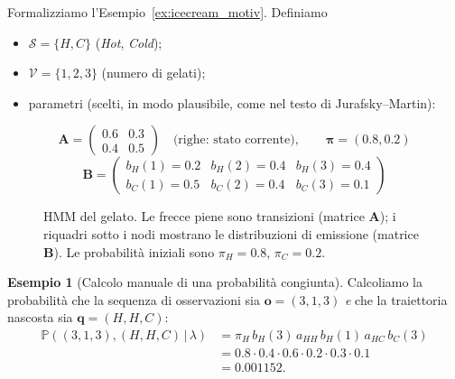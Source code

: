 \documentclass[11pt,a4paper,oneside]{book}
\theoremstyle{plain}
\theoremstyle{definition}
\newtheorem{esempio}[teorema]{Esempio}
\theoremstyle{remark}
\newcommand{\Prob}{\mathbb{P}}
\newcommand{\states}{\mathcal{S}}            %
\newcommand{\obssym}{\mathcal{V}}            %
\newcommand{\Amat}{\mathbf{A}}               %
\newcommand{\Bmat}{\mathbf{B}}               %
\newcommand{\initvec}{\boldsymbol{\pi}}      %
\newcommand{\hmm}{\lambda}                   %
\newcommand{\seqobs}{\mathbf{o}}             %
\newcommand{\seqstates}{\mathbf{q}}          %
\newcommand{\given}{\,\vert\,}
\begin{document}
Formalizziamo l'Esempio~\ref{ex:icecream_motiv}. Definiamo
\begin{itemize}[leftmargin=*]
    \item $\states=\{H,C\}$ (\emph{Hot}, \emph{Cold});
    \item $\obssym=\{1,2,3\}$ (numero di gelati);
    \item parametri (scelti, in modo plausibile, come nel testo di
          Jurafsky--Martin):
\end{itemize}
\[
\Amat = \begin{pmatrix} 0.6 & 0.3 \\ 0.4 & 0.5 \end{pmatrix}
\quad\text{(righe: stato corrente)},\qquad
\initvec = (0.8, 0.2)
\]
\[
\Bmat = \begin{pmatrix}
b_H(1)=0.2 & b_H(2)=0.4 & b_H(3)=0.4\\
b_C(1)=0.5 & b_C(2)=0.4 & b_C(3)=0.1
\end{pmatrix}
\]

\begin{figure}[h!]
\centering
{}
\caption{HMM del gelato. Le frecce piene sono transizioni (matrice
$\Amat$); i riquadri sotto i nodi mostrano le distribuzioni di
emissione (matrice $\Bmat$). Le probabilità iniziali sono $\pi_H=0.8$,
$\pi_C=0.2$.}
\label{fig:icecream_hmm}
\end{figure}

\begin{esempio}[Calcolo manuale di una probabilità congiunta]
\label{ex:joint_manual}
Calcoliamo la probabilità che la sequenza di osservazioni sia
$\seqobs=(3,1,3)$ \emph{e} che la traiettoria nascosta sia
$\seqstates=(H,H,C)$:
\begin{align*}
\Prob((3,1,3),(H,H,C)\given\hmm)
&= \pi_H\,b_H(3)\,a_{HH}\,b_H(1)\,a_{HC}\,b_C(3)\\
&= 0.8 \cdot 0.4 \cdot 0.6 \cdot 0.2 \cdot 0.3 \cdot 0.1\\
&= 0.001152.
\end{align*}
\end{esempio}
\end{document}
